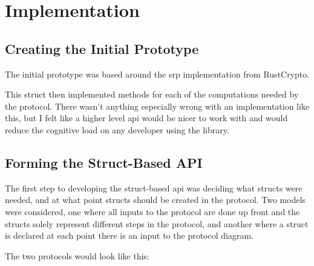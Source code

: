 \chapter{Implementation}
\label{chap:impl}

\section{Creating the Initial Prototype}
The initial prototype was based around the \gls{srp} implementation from RustCrypto.


This struct then implemented methods for each of the computations needed by the protocol.
There wasn't anything especially wrong with an implementation like this, but I felt like a higher level \gls{api} would be nicer to work with and would reduce the cognitive load on any developer using the library.

\section{Forming the Struct-Based API}
The first step to developing the struct-based \gls{api} was deciding what structs were needed, and at what point structs should be created in the protocol.
Two models were considered, one where all inputs to the protocol are done up front and the structs solely represent different steps in the protocol, and another where a struct is declared at each point there is an input to the protocol diagram.

The two protocols would look like this:

